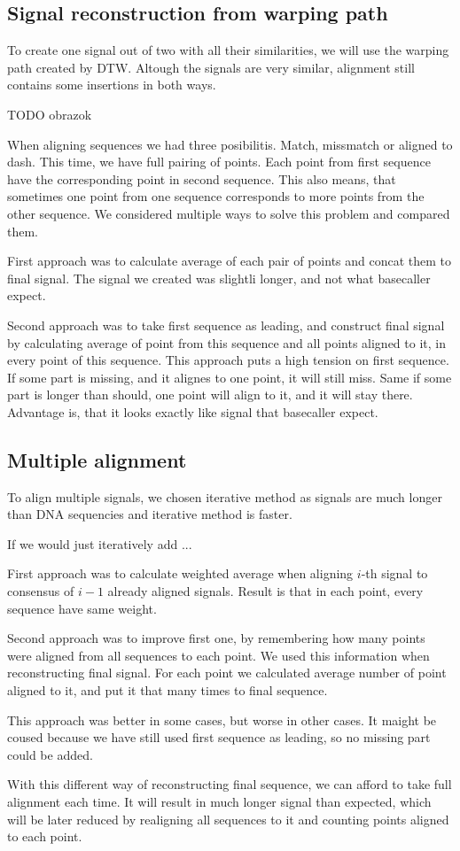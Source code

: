 \subsection{Signal reconstruction from warping path}
To create one signal out of two with all their similarities, we will use the warping path created by DTW.
Altough the signals are very similar, alignment still contains some insertions in both ways. 

TODO obrazok

When aligning sequences we had three posibilitis. Match, missmatch or aligned to dash. 
This time, we have full pairing of points. Each point from first sequence have the corresponding point
in second sequence. This also means, that sometimes one point from one sequence corresponds to more points from the other sequence.
We considered multiple ways to solve this problem and compared them.

First approach was to calculate average of each pair of points and concat them to final signal. The signal we created
was slightli longer, and not what basecaller expect.

Second approach was to take first sequence as leading, and construct final signal by calculating average of point from this sequence and all points aligned to it, in every point of this sequence. This approach puts a high tension on first sequence.
If some part is missing, and it alignes to one point, it will still miss. Same if some part is longer than should, one point will align to it, and it will stay there. Advantage is, that it looks exactly like signal that basecaller expect.

\subsection{Multiple alignment}

To align multiple signals, we chosen iterative method as signals are much longer than DNA sequencies and iterative method is faster.

If we would just iteratively add ...

First approach was to calculate weighted average when aligning $i$-th signal to consensus of $i-1$ already aligned signals. 
Result is that in each point, every sequence have same weight.

Second approach was to improve first one, by remembering how many points were aligned from all sequences to each point. We used
this information when reconstructing final signal. For each point we calculated average number of point aligned to it, and put it that many times to final sequence.

This approach was better in some cases, but worse in other cases. It maight be coused because we have still used first sequence as leading, so no missing part could be added.

With this different way of reconstructing final sequence, we can afford to take full alignment each time. 
It will result in much longer signal than expected, which will be later reduced by realigning all sequences to it and counting 
points aligned to each point.